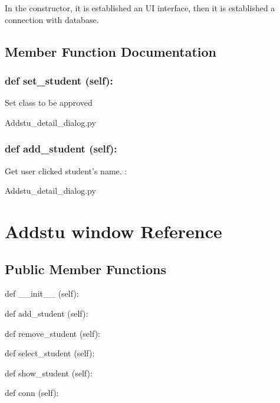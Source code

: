 In the constructor, it is established an UI interface, then it is  established a connection with database.

\subsection{Member Function Documentation}

\hypertarget{class_poly_a14a7ad77ce612b0c54f531d307ee4b39}{
\subsubsection[{def set_student(self):}]{\setlength{\rightskip}{0pt plus 5cm}def {set\_student} (self):}}\label{class_poly_a14a7ad77ce612b0c54f531d307ee4b39}
Set class to be approved
\begin{DoxyCompactItemize}
\item 
Addstu\_detail\_dialog.\-py\end{DoxyCompactItemize}

\hypertarget{class_poly_a14a7ad77ce612b0c54f531d307ee4b39}{
\subsubsection[{def add_student(self):}]{\setlength{\rightskip}{0pt plus 5cm}def {add\_student} (self):}}\label{class_poly_a14a7ad77ce612b0c54f531d307ee4b39}
Get user clicked student's name.
:\begin{DoxyCompactItemize}
\item 
Addstu\_detail\_dialog.\-py\end{DoxyCompactItemize}



\hypertarget{Addstu_window}{\section{Addstu window Reference}
\label{Addstu_window}
}
\subsection*{Public Member Functions}
\begin{DoxyCompactItemize}
\item 
def {\_\_init\_\_} (self):
\item 
def {add\_student} (self):
\item 
def {remove\_student} (self):
\item 
def {select\_student} (self):
\item 
def {show\_student} (self):
\item 
def {conn} (self):

\end{DoxyCompactItemize}


